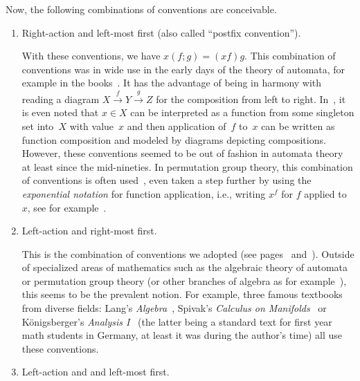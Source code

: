 Now, the following combinations of conventions are conceivable.

\begin{enumerate}
	
	\item Right-action and left-most first (also called ``postfix convention'').
	
    With these conventions, %
	we have $x(f ; g) = (xf)g$. This combination of conventions was
	in wide use in the early days of the theory of automata, 
	for example in the books~\cite{Eilenberg1974,Eilenberg1976,Ginzburg68,Pin86}. 
	It has the advantage of being
	in harmony with reading 
	a diagram $X \xrightarrow{f} Y \xrightarrow{g} Z$
	for the composition from left to right.
	In~\cite[p.~1]{Eilenberg1974},
	it is even noted that $x \in X$ can be interpreted as a function
	from some singleton set into~$X$ with value~$x$
	and then application of~$f$ to~$x$ can be written as function composition
	and modeled by diagrams depicting compositions. 
	However, these conventions seemed to be out of fashion in automata theory
	at least since the mid-nineties.
	In permutation group theory, this combination of conventions 
	is often used~\cite{cameron_1999,dixon1996permutation,wielandt1964finite}, even taken a step further by using
	the \emph{exponential notation} for function application, i.e., writing $x^f$
	for $f$ applied to $x$, see for example~\cite{Kurzweil04}.
		
	\item Left-action and right-most first.
	
	This is the combination of conventions we adopted (see pages~\pageref{def:function-application} 
	and~\pageref{def:fun_comp}). Outside of specialized areas of mathematics such 
	as the algebraic theory of automata or permutation group theory (or other branches of algebra as for example~\cite{Ferri2025_SplitLemmaGroupoids}), this seems
	to be the prevalent notion. For example, three famous textbooks from diverse fields: Lang's \emph{Algebra}~\cite{lang02},
	Spivak's \emph{Calculus on Manifolds}~\cite{spivak1971calculus} 
	or Königsberger's \emph{Analysis I}~\cite{koenigsberger2003analysis} (the latter being a standard text for first year math students in Germany, at least it was during the author's time) all use these conventions.
		
	\item Left-action and and left-most first.
		

\end{enumerate}
